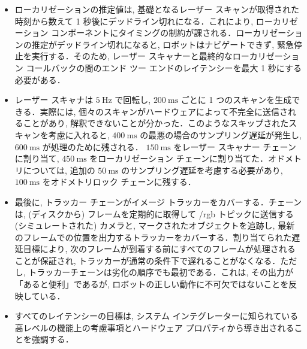 \begin{frame}{}
    \begin{itemize}
        \item ローカリゼーションの推定値は, 基礎となるレーザー スキャンが取得された時刻から数えて 1 秒後にデッドライン切れになる．これにより, ローカリゼーション コンポーネントにタイミングの制約が課される．ローカリゼーションの推定がデッドライン切れになると, ロボットはナビゲートできず, 緊急停止を実行する．そのため, レーザー スキャナーと最終的なローカリゼーション コールバックの間のエンド ツー エンドのレイテンシーを最大 1 秒にする必要がある．
    \end{itemize}
\end{frame}

\begin{frame}{}
    \begin{itemize}
        \item レーザー スキャナは $5 \mathrm{~Hz}$ で回転し, $200 \mathrm{~ms}$ ごとに 1 つのスキャンを生成できる．実際には, 個々のスキャンがハードウェアによって不完全に送信されることがあり, 解釈できないことが分かった．このようなスキップされたスキャンを考慮に入れると, $400 \mathrm{~ms}$ の最悪の場合のサンプリング遅延が発生し, $600 \mathrm{~ms}$ が処理のために残される． $150 \mathrm{~ms}$ をレーザー スキャナー チェーンに割り当て, $450 \mathrm{~ms}$ をローカリゼーション チェーンに割り当てた．オドメトリについては, 追加の $50 \mathrm{~ms}$ のサンプリング遅延を考慮する必要があり, $100 \mathrm{~ms}$ をオドメトリロック チェーンに残する．
    \end{itemize}
\end{frame}

\begin{frame}{}
    \begin{itemize}
        \item 最後に, トラッカー チェーンがイメージ トラッカーをカバーする．チェーンは, (ディスクから) フレームを定期的に取得して /rgb トピックに送信する (シミュレートされた) カメラと, マークされたオブジェクトを追跡し, 最新のフレームでの位置を出力するトラッカーをカバーする．割り当てられた遅延目標により, 次のフレームが到着する前にすべてのフレームが処理されることが保証され, トラッカーが通常の条件下で遅れることがなくなる．ただし, トラッカーチェーンは劣化の順序でも最初である．これは, その出力が「あると便利」であるが, ロボットの正しい動作に不可欠ではないことを反映している．
    \end{itemize}
\end{frame}

\begin{frame}{}
    \begin{itemize}
        \item すべてのレイテンシーの目標は, システム インテグレーターに知られている高レベルの機能上の考慮事項とハードウェア プロパティから導き出されることを強調する．
    \end{itemize}
\end{frame}

